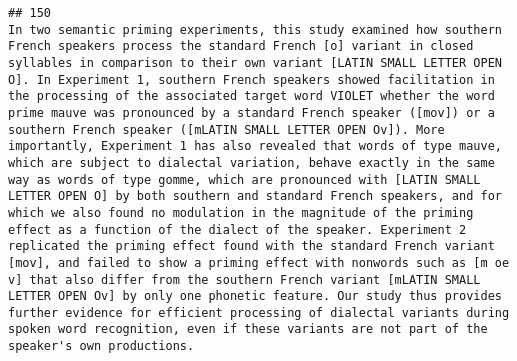 \documentclass[
  english,
  man]{apa6}
\begin{document}
\begin{verbatim}
## 150                                                                                                                                                                                                                                                                                                                                                                                                                                                                                                                                                                                                                                                                                                                                                                                                                                                                                                                                                                                                                                                                                                                                                                                                                                                                                             In two semantic priming experiments, this study examined how southern French speakers process the standard French [o] variant in closed syllables in comparison to their own variant [LATIN SMALL LETTER OPEN O]. In Experiment 1, southern French speakers showed facilitation in the processing of the associated target word VIOLET whether the word prime mauve was pronounced by a standard French speaker ([mov]) or a southern French speaker ([mLATIN SMALL LETTER OPEN Ov]). More importantly, Experiment 1 has also revealed that words of type mauve, which are subject to dialectal variation, behave exactly in the same way as words of type gomme, which are pronounced with [LATIN SMALL LETTER OPEN O] by both southern and standard French speakers, and for which we also found no modulation in the magnitude of the priming effect as a function of the dialect of the speaker. Experiment 2 replicated the priming effect found with the standard French variant [mov], and failed to show a priming effect with nonwords such as [m oe v] that also differ from the southern French variant [mLATIN SMALL LETTER OPEN Ov] by only one phonetic feature. Our study thus provides further evidence for efficient processing of dialectal variants during spoken word recognition, even if these variants are not part of the speaker's own productions.

\end{verbatim}
\end{document}
